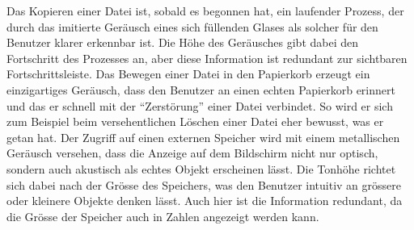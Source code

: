 
Das Kopieren einer Datei ist, sobald es begonnen hat, 
ein laufender Prozess, der durch das imitierte Geräusch eines sich füllenden Glases als solcher für den Benutzer klarer erkennbar ist. 
Die Höhe des Geräusches gibt dabei den Fortschritt des Prozesses an, aber diese Information ist redundant zur sichtbaren Fortschrittsleiste.
Das Bewegen einer Datei in den Papierkorb erzeugt ein einzigartiges Geräusch,
dass den Benutzer an einen echten Papierkorb erinnert und das er schnell mit der \enquote{Zerstörung} einer Datei verbindet. 
So wird er sich zum Beispiel beim versehentlichen Löschen einer Datei eher bewusst, was er getan hat.
Der Zugriff auf einen externen Speicher wird mit einem metallischen Geräusch versehen,
dass die Anzeige auf dem Bildschirm nicht nur optisch, 
sondern auch akustisch als echtes Objekt erscheinen lässt. 
Die Tonhöhe richtet sich dabei nach der Grösse des Speichers, 
was den Benutzer intuitiv an grössere oder kleinere Objekte denken lässt. 
Auch hier ist die Information redundant, da die Grösse der Speicher auch in Zahlen angezeigt werden kann.